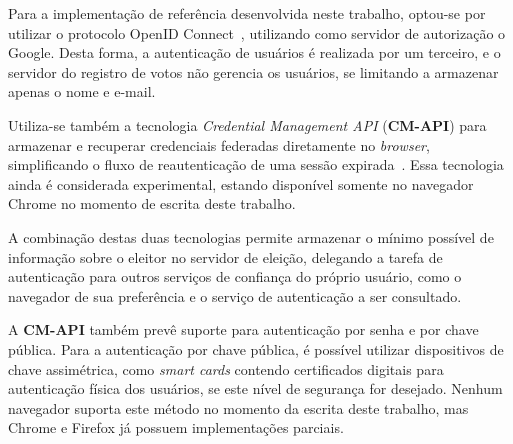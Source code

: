 Para a implementação de referência desenvolvida neste trabalho, optou-se por
utilizar o protocolo OpenID Connect~\cite{sakimura2014openid}, utilizando como
servidor de autorização o Google. Desta forma, a autenticação de usuários é
realizada por um terceiro, e o servidor do registro de votos não gerencia os
usuários, se limitando a armazenar apenas o nome e e-mail.

Utiliza-se também a tecnologia \textit{Credential Management API}
(\textbf{CM-API}) para armazenar e recuperar credenciais federadas diretamente
no \textit{browser}, simplificando o fluxo de reautenticação de uma sessão
expirada~\cite{Credenti82:online}. Essa tecnologia ainda é considerada
experimental, estando disponível somente no navegador Chrome no momento de
escrita deste trabalho.

A combinação destas duas tecnologias permite armazenar o mínimo possível de
informação sobre o eleitor no servidor de eleição, delegando a tarefa de
autenticação para outros serviços de confiança do próprio usuário, como o
navegador de sua preferência e o serviço de autenticação a ser consultado.

A \textbf{CM-API} também prevê suporte para autenticação por senha e por chave
pública. Para a autenticação por chave pública, é possível utilizar
dispositivos de chave assimétrica, como \textit{smart cards} contendo
certificados digitais para autenticação física dos usuários, se este nível de
segurança for desejado. Nenhum navegador suporta este método no momento da
escrita deste trabalho, mas Chrome e Firefox já possuem implementações
parciais.
